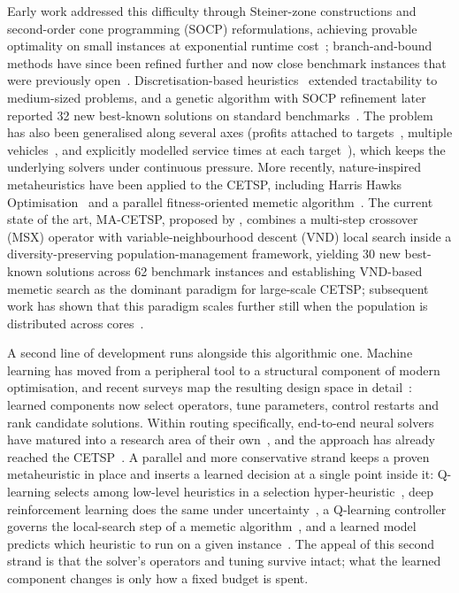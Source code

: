 \documentclass[a4paper,fleqn]{cas-dc}
\begin{document}
Early work addressed this difficulty through Steiner-zone constructions and
second-order cone programming (SOCP) reformulations, achieving provable
optimality on small instances at exponential runtime
cost~\citep{behdani2014integer,coutinho2016branch}; branch-and-bound methods
have since been refined further and now close benchmark instances that were
previously open~\citep{zhang2023cetspbb}. Discretisation-based
heuristics~\citep{CARRABS2017163,carrabs2020adaptive} extended tractability to
medium-sized problems, and a genetic algorithm with SOCP refinement later
reported 32 new best-known solutions on standard
benchmarks~\citep{DIPLACIDO2022105831}. The problem has also been generalised
along several axes (profits attached to targets~\citep{diplacido2023generalized},
multiple vehicles~\citep{carrabs2025upper}, and explicitly modelled service
times at each target~\citep{cui2026service}), which keeps the underlying
solvers under continuous pressure. More recently, nature-inspired
metaheuristics have been applied to the CETSP, including Harris Hawks
Optimisation~\citep{dokeroglu2025hho} and a parallel fitness-oriented memetic
algorithm~\citep{canturk2025parallel}. The current state of the art, MA-CETSP,
proposed by \citet{LEI2024111266}, combines a multi-step crossover (MSX)
operator with variable-neighbourhood descent (VND) local search inside a
diversity-preserving population-management framework, yielding 30 new best-known
solutions across 62 benchmark instances and establishing VND-based memetic
search as the dominant paradigm for large-scale CETSP; subsequent work has shown
that this paradigm scales further still when the population is distributed
across cores~\citep{canturk2026scalable}.

A second line of development runs alongside this algorithmic one. Machine
learning has moved from a peripheral tool to a structural component of modern
optimisation, and recent surveys map the resulting design space in
detail~\citep{talbi2021mlmeta,bolufe2025mlmeta}: learned components now select
operators, tune parameters, control restarts and rank candidate solutions.
Within routing specifically, end-to-end neural solvers have matured into a
research area of their own~\citep{wu2026ncosurvey}, and the approach has already
reached the CETSP~\citep{fan2025ud3rl}. A parallel and more conservative strand
keeps a proven metaheuristic in place and inserts a learned decision at a single
point inside it: Q-learning selects among low-level heuristics in a selection
hyper-heuristic~\citep{zhao2023qlhh}, deep reinforcement learning does the same
under uncertainty~\citep{zhang2022drlhh}, a Q-learning controller governs the
local-search step of a memetic algorithm~\citep{zhang2024qlmemetic}, and a
learned model predicts which heuristic to run on a given
instance~\citep{karcher2025heuristic}. The appeal of this second strand is that
the solver's operators and tuning survive intact; what the learned component
changes is only how a fixed budget is spent.
\end{document}
